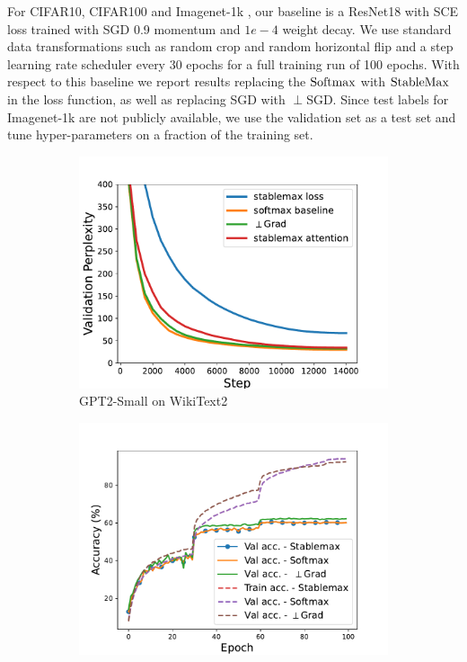 For CIFAR10, CIFAR100 and Imagenet-1k \citep{ILSVRC15}, our baseline is a ResNet18 with SCE loss trained with SGD 0.9 momentum and $1e-4$ weight decay. We use standard data transformations such as random crop and random horizontal flip and a step learning rate scheduler every 30 epochs for a full training run of 100 epochs. With respect to this baseline we report results replacing the $\mathrm{Softmax}$ with $\mathrm{StableMax}$ in the loss function, as well as replacing SGD with $\perp$SGD. Since test labels for Imagenet-1k are not publicly available, we use the validation set as a test set and tune hyper-parameters on a fraction of the training set.


\begin{figure}[t]
    \centering
    \begin{subfigure}{.32\textwidth}
    \includegraphics[width=\linewidth]{grokking_iclr_arxiv/figures/gpt2-small.pdf}
        \caption{GPT2-Small on WikiText2}
        \label{fig:gpt2_small}
    \end{subfigure}
    \hfill
    \begin{subfigure}{.32\textwidth}
    \includegraphics[width=\linewidth]{grokking_iclr_arxiv/figures/CIFAR100.pdf}

\end{subfigure}
\end{figure}
